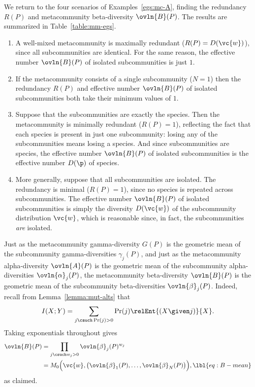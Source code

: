 \begin{examples}
We return to the four scenarios of Examples~\ref{egs:mc-A}, finding the
redundancy $R(P)$ and metacommunity beta-diversity
$\ovln{B}(P)$.  The results are summarized in Table~\ref{table:mm-egs}.
% 
\begin{enumerate}
\item
{}
A well-mixed metacommunity is maximally redundant ($R(P) = D(\vc{w})$),
since all subcommunities are identical.  For the same reason, the effective
number $\ovln{B}(P)$ of isolated subcommunities is just $1$.

\item
{}
If the metacommunity consists of a single subcommunity ($N = 1$) then the
redundancy $R(P)$ and effective number $\ovln{B}(P)$ of isolated
subcommunities both take their minimum values of $1$.  

\item
{}
Suppose that the subcommunities are exactly the species.  Then 
the metacommunity is minimally redundant ($R(P) = 1$), reflecting the fact
that each species is present in just one subcommunity: losing any of the
subcommunities means losing a species.  And since subcommunities are
species, the effective number $\ovln{B}(P)$ of isolated subcommunities is the
effective number $D(\p)$ of species.  

\item
{}
More generally, suppose that all subcommunities are isolated.  The
redundancy is minimal ($R(P) = 1$), since no species is repeated across
subcommunities.  The effective number $\ovln{B}(P)$ of isolated
subcommunities is simply the diversity $D(\vc{w})$ of the subcommunity
distribution $\vc{w}$, which is reasonable since, in fact, the
subcommunities \emph{are} isolated.
\end{enumerate}
\end{examples}

Just as the metacommunity gamma-diversity $G(P)$ is the geometric mean of
the subcommunity gamma-diversities $\gamma_j(P)$, and just as the
metacommunity alpha-diversity $\ovln{A}(P)$ is the geometric mean of the
subcommunity alpha-diversities $\ovln{\alpha}_j(P)$, the metacommunity
beta-diversity $\ovln{B}(P)$ is the geometric mean of the subcommunity
beta-diversities $\ovln{\beta}_j(P)$.  Indeed, recall from
Lemma~\ref{lemma:mut-alts} that
\[
I(X; Y)
=
\sum_{j \csuch \Pr(j) > 0} \Pr(j) \relEnt{(X \given j)}{X}.
\]
Taking exponentials throughout gives
% 
\begin{align}
\ovln{B}(P)        &
=
\prod_{j \csuch w_j > 0} \ovln{\beta}_j(P)^{w_j}   
\nonumber       \\
&
=
M_0 \Bigl( \vc{w}, \bigl(\ovln{\beta}_1(P), \ldots, \ovln{\beta}_N(P)\bigr) 
\Bigr),
\lbl{eq:B-mean}
\end{align}
% 
as claimed.

